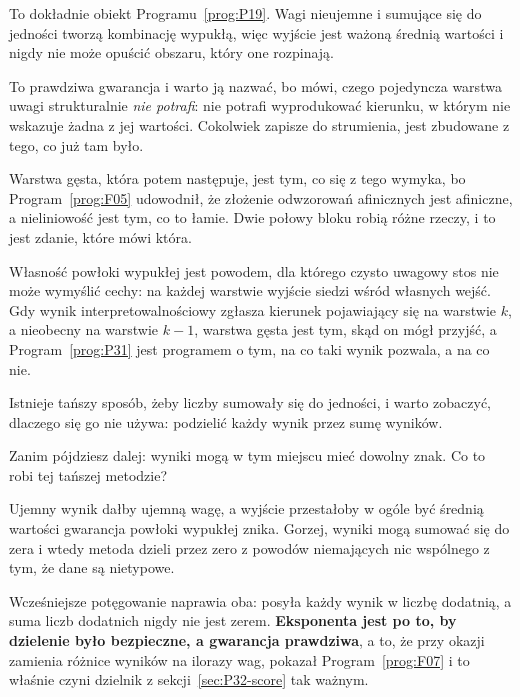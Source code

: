 \begin{fr}

To dokładnie obiekt Programu~\ref{prog:P19}. Wagi nieujemne i sumujące się do
jedności tworzą kombinację wypukłą, więc wyjście jest ważoną średnią wartości
i nigdy nie może opuścić obszaru, który one rozpinają.

To prawdziwa gwarancja i warto ją nazwać, bo mówi, czego pojedyncza warstwa
uwagi strukturalnie \emph{nie potrafi}: nie potrafi wyprodukować kierunku, w
którym nie wskazuje żadna z jej wartości. Cokolwiek zapisze do strumienia,
jest zbudowane z tego, co już tam było.

Warstwa gęsta, która potem następuje, jest tym, co się z tego wymyka, bo
Program~\ref{prog:F05} udowodnił, że złożenie odwzorowań afinicznych jest
afiniczne, a nieliniowość jest tym, co to łamie. Dwie połowy bloku robią
różne rzeczy, i to jest zdanie, które mówi która.

\begin{aibox}
Własność powłoki wypukłej jest powodem, dla którego czysto uwagowy stos nie
może wymyślić cechy: na każdej warstwie wyjście siedzi wśród własnych wejść.
Gdy wynik interpretowalnościowy zgłasza kierunek pojawiający się na warstwie
$k$, a nieobecny na warstwie $k-1$, warstwa gęsta jest tym, skąd on mógł
przyjść, a Program~\ref{prog:P31} jest programem o tym, na co taki wynik
pozwala, a na co nie.
\end{aibox}
\end{fr}

\begin{fr}
Istnieje tańszy sposób, żeby liczby sumowały się do jedności, i warto
zobaczyć, dlaczego się go nie używa: podzielić każdy wynik przez sumę
wyników.

Zanim pójdziesz dalej: wyniki mogą w tym miejscu mieć dowolny znak. Co to
robi tej tańszej metodzie?
\dotline
\nextframe
\end{fr}

\begin{fr}

Ujemny wynik dałby ujemną wagę, a wyjście przestałoby w ogóle być średnią
wartości \dash{} gwarancja powłoki wypukłej znika. Gorzej, wyniki mogą sumować
się do zera i wtedy metoda dzieli przez zero z powodów niemających nic
wspólnego z tym, że dane są nietypowe.

Wcześniejsze potęgowanie naprawia oba: posyła każdy wynik w liczbę dodatnią, a
suma liczb dodatnich nigdy nie jest zerem. \textbf{Eksponenta jest po to, by
dzielenie było bezpieczne, a gwarancja prawdziwa}, a to, że przy okazji
zamienia różnice wyników na ilorazy wag, pokazał Program~\ref{prog:F07} i to
właśnie czyni dzielnik z sekcji~\ref{sec:P32-score} tak ważnym.
\end{fr}

